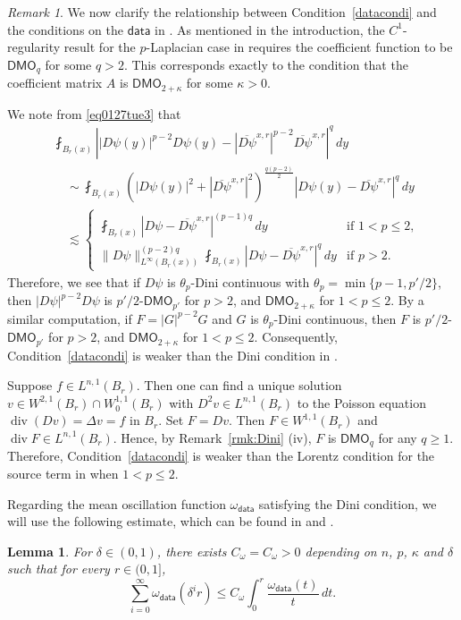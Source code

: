 \documentclass[reqno]{amsart}
\numberwithin{equation}{section}
\theoremstyle{plain}
\newtheorem{lemma}[theorem]{Lemma}
\theoremstyle{definition}
\theoremstyle{remark}
\newtheorem{remark}[theorem]{Remark}
\DeclareMathOperator{\dv}{div}
\begin{document}
\begin{remark} \label{rmk:Dinimeancond}
We now clarify the relationship between Condition~\ref{datacondi} and the conditions on the $\mathsf{data}$ in \cite{HLO25,KM14,Ok17}. As mentioned in the introduction, the $C^1$-regularity result for the $p$-Laplacian case in \cite{HLO25} requires the coefficient function to be $\mathsf{DMO}_{q}$ for some $q>2$.  This corresponds exactly to the condition that the coefficient matrix $A$ is $\mathsf{DMO}_{2+\kappa}$ for some $\kappa>0$.



We note from \eqref{eq0127tue3} that 
\[\begin{split}
&\fint_{B_r(x)}\left||D\psi(y)|^{p-2}D\psi(y) -  |\overline{D\psi}^{x,r}|^{p-2}\overline{D\psi}^{x,r}\right|^q\,dy \\
&\quad \sim \fint_{B_r(x)}\left(|D\psi(y)|^2+  |\overline{D\psi}^{x,r}|^2\right)^{\frac{q(p-2)}{2}}|D\psi(y)-\overline{D\psi}^{x,r}|^q\,dy\\
&\quad \lesssim \begin{cases} 
\fint_{B_r(x)}|D\psi-\overline{D\psi}^{x,r}|^{(p-1)q}\,dy 
&\text{if } 1<p\le 2,\\[1ex]
\|D\psi\|_{L^\infty(B_r(x))}^{(p-2)q}\fint_{B_r(x)}|D\psi-\overline{D\psi}^{x,r}|^q\,dy
&\text{if } p> 2.
\end{cases}
\end{split}\]
Therefore, we see that if $D\psi$ is $\theta_p$-Dini continuous with $\theta_p=\min\{p-1,p'/2\}$, then $|D\psi|^{p-2}D\psi$ is $p'/2$-$\mathsf{DMO}_{p'}$ for $p > 2$, and $\mathsf{DMO}_{2+\kappa}$ for $1 < p \le 2$. By a similar computation, if $F=|G|^{p-2}G$ and $G$ is $\theta_p$-Dini continuous, then $F$ is $p'/2$-$\mathsf{DMO}_{p'}$ for $p > 2$, and $\mathsf{DMO}_{2+\kappa}$ for $1 < p \le 2$. Consequently, Condition~\ref{datacondi} is weaker than the Dini condition in \cite{Ok17}.

Suppose $f\in L^{n,1}(B_r)$. Then one can find a unique solution $v\in W^{2,1}(B_r)\cap W^{1,1}_0(B_r)$ with $D^2v\in L^{n,1}(B_r)$ to the Poisson equation $\dv (Dv) = \Delta v=f$ in $B_r$. Set $F=Dv$. Then $F\in W^{1,1}(B_r)$ and $\dv F\in L^{n,1}(B_r)$. Hence, by Remark~\ref{rmk:Dini} (iv), $F$ is $\mathsf{DMO}_q$ for any $q\ge 1$. Therefore, Condition~\ref{datacondi} is weaker than the Lorentz condition for the source term in \cite{KM14} when $1< p\le 2$.
\end{remark}


Regarding the mean oscillation function $\omega_{\mathsf{data}}$ satisfying the Dini condition, we will use the following estimate, which can be found in \cite[Lemma 2.7]{DK17} and \cite[Lemma 3.6]{HLO25}.
\begin{lemma}\label{lem:Dini}
For $\delta\in(0,1)$, there exists $C_\omega=C_\omega>0$ depending on $n$, $p$, $\kappa$ and $\delta$ such that for every $r\in(0,1]$,
\begin{equation*}%
\sum^\infty_{i=0} \omega_{\mathsf{data}}(\delta^i r) \leq C_\omega \int^r_0 \frac{\omega_{\mathsf{data}}(t)}{t}\,dt.
\end{equation*}
\end{lemma}
 
\end{document}
